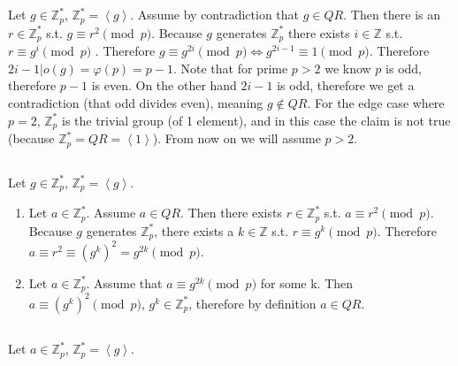 \documentclass{article}
\begin{document}
\subsection{}
Let $g\in\mathbb{Z}_{p}^{*}$, $\mathbb{Z}_{p}^{*}=\left\langle g\right\rangle $.
Assume by contradiction that $g\in QR$. Then there is an $r\in\mathbb{Z}_{p}^{*}$
s.t. $g\equiv r^{2}\pmod p$. Because $g$ generates $\mathbb{Z}_{p}^{*}$
there exists $i\in\mathbb{Z}$ s.t. $r\equiv g^{i}\pmod p$ . Therefore
$g\equiv g^{2i}\pmod p\iff g^{2i-1}\equiv1\pmod p$. Therefore $2i-1\vert o\left(g\right)=\varphi\left(p\right)=p-1$.
Note that for prime $p>2$ we know $p$ is odd, therefore $p-1$ is
even. On the other hand $2i-1$ is odd, therefore we get a contradiction
(that odd divides even), meaning $g\notin QR$. For the edge case
where $p=2$, $\mathbb{Z}_{p}^{*}$ is the trivial group (of 1 element),
and in this case the claim is not true (because $\mathbb{Z}_{p}^{*}=QR=\left\langle 1\right\rangle $).
From now on we will assume $p>2$.

\subsection{}
Let $g\in\mathbb{Z}_{p}^{*}$, $\mathbb{Z}_{p}^{*}=\left\langle g\right\rangle $.

\begin{enumerate}[i]
\item Let $a\in\mathbb{Z}_{p}^{*}$. Assume $a\in QR$. Then there exists
$r\in\mathbb{Z}_{p}^{*}$ s.t. $a\equiv r^{2}\pmod p$. Because $g$
generates $\mathbb{Z}_{p}^{*}$, there exists a $k\in\mathbb{Z}$
s.t. $r\equiv g^{k}\pmod p$. Therefore $a\equiv r^{2}\equiv\left(g^{k}\right)^{2}=g^{2k}\pmod p$.
\item Let $a\in\mathbb{Z}_{p}^{*}$. Assume that $a\equiv g^{2k}\pmod p$
for some k. Then $a\equiv\left(g^{k}\right)^{2}\pmod p$, $g^{k}\in\mathbb{Z}_{p}^{*}$,
therefore by definition $a\in QR.$
\end{enumerate}


\subsection{}
Let $a\in\mathbb{Z}_{p}^{*}$, $\mathbb{Z}_{p}^{*}=\left\langle g\right\rangle $.
\end{document}
